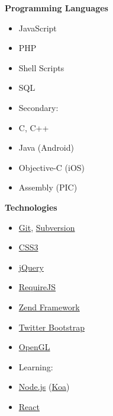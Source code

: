 \noindent
\begin{minipage}[t]{.3\linewidth}
\vspace{0pt}
\textbf{Programming Languages}
\begin{itemize}[itemsep=0pt]    %
    \item JavaScript
    \item PHP
    \item Shell Scripts
    \item SQL
    \item[] \hspace*{-2em} Secondary:
    \item C, C++
    \item Java (Android)
    \item Objective-C (iOS)
    \item Assembly (PIC)
\end{itemize}
\end{minipage}
%
\hfill
%
\begin{minipage}[t]{.25\linewidth}
\vspace{0pt}
\textbf{Technologies}
\begin{itemize}[itemsep=0pt]
    \item \href{http://git-scm.com}{Git}, \href{http://subversion.apache.org}{Subversion}
    \item \href{http://www.w3.org/Style/CSS}{CSS3}
    \item \href{http://jquery.com}{jQuery}
    \item \href{http://requirejs.org}{RequireJS}
    \item \href{http://framework.zend.com}{Zend Framework}
    \item \href{http://getbootstrap.com}{Twitter Bootstrap}
    \item \href{http://www.opengl.org}{OpenGL}
    \item[] \hspace*{-2em} Learning:
    \item \href{http://nodejs.org}{Node.js} (\href{http://koajs.com}{Koa})
    \item \href{http://facebook.github.io/react}{React}
\end{itemize}
\end{minipage}
%
\hfill
%
